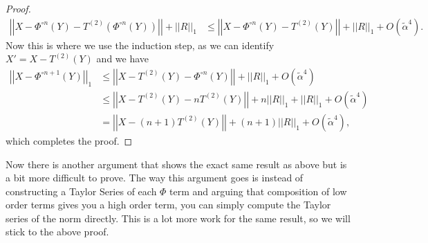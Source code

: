 \documentclass{article}
\newcommand{\norm}[1]{\left| \left| #1 \right| \right|}
\newcommand{\bigo}[1]{O\left( #1 \right)}
\begin{document}
\begin{proof}
\begin{align}
    \norm{X - \Phi^{\circ n}(Y) - T^{(2)}(\Phi^{\circ n}(Y))} + \norm{R}_1 &\le \norm{X - \Phi^{\circ n}(Y) - T^{(2)}(Y)} + \norm{R}_1 + \bigo{\widetilde{\alpha }^4}.
\end{align}
Now this is where we use the induction step, as we can identify $X' = X - T^{(2)}(Y)$ and we have
\begin{align}
    \norm{X - \Phi^{\circ n + 1}(Y)}_1 &\le \norm{X - T^{(2)}(Y) - \Phi^{\circ n}(Y) } + \norm{R}_1 + \bigo{\widetilde{\alpha }^4} \\
    &\le \norm{X - T^{(2)}(Y) - n T^{(2)}(Y)} + n \norm{R}_1 + \norm{R}_1 + \bigo{\widetilde{\alpha}^4} \\
    &=\norm{X - (n + 1) T^{(2)}(Y)} + (n + 1) \norm{R}_1 + \bigo{\widetilde{\alpha}^4},
\end{align}
which completes the proof.
\end{proof}
Now there is another argument that shows the exact same result as above but is a bit more difficult to prove. The way this argument goes is instead of constructing a Taylor Series of each $\Phi$ term and arguing that composition of low order terms gives you a high order term, you can simply compute the Taylor series of the norm directly. This is a lot more work for the same result, so we will stick to the above proof.
\end{document}
